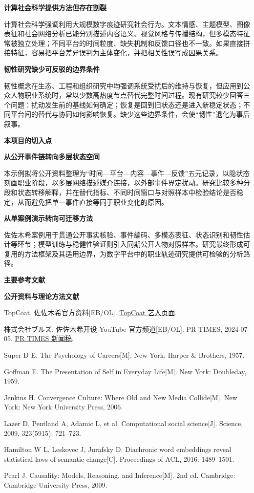 \noindent\textbf{计算社会科学提供方法但存在割裂}\par
计算社会科学强调利用大规模数字痕迹研究社会行为。文本情感、主题模型、图像表征和社会网络分析已能分别描述内容语义、视觉风格与传播结构，但多模态特征常被独立处理；不同平台的时间粒度、缺失机制和反馈口径也不一致。如果直接拼接特征，容易把平台差异误判为主体变化，并把相关性误写成因果关系。

\noindent\textbf{韧性研究缺少可反驳的边界条件}\par
韧性概念在生态、工程和组织研究中均强调系统受扰后的维持与恢复，但应用到公众人物职业系统时，常以少数高热度节点替代完整时间过程。现有研究较少回答三个问题：扰动发生前的基线如何确定；恢复是回到旧状态还是进入新稳定状态；不同平台间的替代与协同如何影响恢复。缺少这些边界条件，会使“韧性”退化为事后叙事。

\noindent\textbf{本项目的切入点}\par

\noindent\textbf{从公开事件链转向多层状态空间}\par
本示例拟将公开资料整理为“时间—平台—内容—事件—反馈”五元记录，以隐状态刻画职业阶段，以多层网络描述媒介连接，以外部事件界定扰动。研究比较多种分段和状态转移解释，并在替代指标、不同时间窗口与对照样本中检验结论是否稳定，从而避免把单一事件直接等同于职业变化的原因。

\noindent\textbf{从单案例演示转向可迁移方法}\par
佐佐木希案例用于贯通公开事实核验、事件编码、多模态表征、状态识别和韧性估计等环节；模型训练与稳健性验证则引入同期公开人物对照样本。研究最终形成可复用的方法框架及其适用边界，为数字平台中的职业轨迹研究提供可检验的分析路径。

\noindent\textbf{主要参考文献}\par

\noindent\textbf{公开资料与理论方法文献}\par
\begin{enumerate}[label={\textup{[\arabic*]}},leftmargin=*,itemsep=0pt]
  \item TopCoat. 佐佐木希官方资料[EB/OL]. \href{https://topcoat.co.jp/nozomi_sasaki}{TopCoat 艺人页面}.
  \item 株式会社ブルズ. 佐佐木希开设 YouTube 官方频道[EB/OL]. PR TIMES, 2024-07-05. \href{https://prtimes.jp/main/html/rd/p/000000020.000059044.html}{PR TIMES 新闻稿}.
  \item Super D E. The Psychology of Careers[M]. New York: Harper \& Brothers, 1957.
  \item Goffman E. The Presentation of Self in Everyday Life[M]. New York: Doubleday, 1959.
  \item Jenkins H. Convergence Culture: Where Old and New Media Collide[M]. New York: New York University Press, 2006.
  \item Lazer D, Pentland A, Adamic L, et al. Computational social science[J]. Science, 2009, 323(5915): 721--723.
  \item Hamilton W L, Leskovec J, Jurafsky D. Diachronic word embeddings reveal statistical laws of semantic change[C]. Proceedings of ACL, 2016: 1489--1501.
  \item Pearl J. Causality: Models, Reasoning, and Inference[M]. 2nd ed. Cambridge: Cambridge University Press, 2009.
\end{enumerate}
